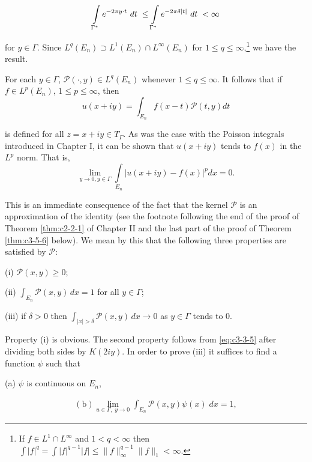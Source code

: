 \[
\intop_{\Gamma^{*}}e^{-2\pi y\cdot t}\mathop{}{d}t\;\leq\intop_{\Gamma^{*}}e^{-2\pi\delta|t|}\mathop{}{d}t\;<\infty
\]

for $y \in \Gamma$. Since $L^q(E_n) \supset L^1(E_n) \cap L^\infty(E_n)$ for $1 \leq q \leq \infty$,\footnote{If $f \in L^1 \cap L^\infty$ and $1 < q < \infty$ then $\int |f|^q = \int |f|^{q-1}|f| \leq \|f\|_\infty^{q-1}\|f\|_1 < \infty$.} we have the result.

\begin{corollary}
\label{cor:c3-3-7}
For each $y \in \Gamma$, $\mathcal{P}(\cdot, y) \in L^q(E_n)$ whenever $1 \leq q \leq \infty$. It follows that if $f \in L^p(E_n)$, $1 \leq p \leq \infty$, then
\[
u(x+i y)=\int_{E_{n}}f(x-t)\mathcal{P}(t,y)d t
\]

is defined for all $z = x + iy \in T_{\Gamma}$. As was the case with the Poisson integrals introduced in Chapter I, it can be shown that $u(x + iy)$ tends to $f(x)$ in the $L^{p}$ norm. That is,
\begin{equation}\label{eq:c3-3-8}
\lim_{y\to0,y\in\Gamma}\int\limits_{E_{n}}|u(x+iy)-f(x)|^{p} dx=0.
\end{equation}

\end{corollary}

This is an immediate consequence of the fact that the kernel $\mathcal{P}$ is an approximation of the identity (see the footnote following the end of the proof of Theorem \ref{thm:c2-2-1} of Chapter II and the last part of the proof of Theorem \ref{thm:c3-5-6} below). We mean by this that the following three properties are satisfied by $\mathcal{P}$:

(i) $\mathcal{P}(x, y) \geq 0$;

(ii) $\int_{E_n} \mathcal{P}(x, y) \, dx = 1$ for all $y \in \Gamma$;

(iii) if $\delta > 0$ then $\int_{|x| > \delta} \mathcal{P}(x, y) \, dx \to 0$ as $y \in \Gamma$ tends to 0.

Property (i) is obvious. The second property follows from \eqref{eq:c3-3-5} after dividing both sides by $K(2iy)$. In order to prove (iii) it suffices to find a function $\psi$ such that

(a) $\psi$ is continuous on $E_{n}$,

\[
\begin{array}{r}{\mathrm{(b)}\lim_{u\in\Gamma,\;y\rightarrow0}\int_{E_{n}}\mathcal{P}(x,y)\psi(x)\;d x=1,}\end{array}
\]

